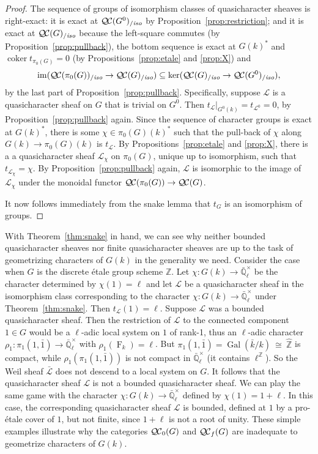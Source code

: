 \documentclass[11pt]{amsart}
\theoremstyle{plain}
\theoremstyle{definition}
\theoremstyle{remark}
\newcommand{\ZZ}{{\mathbb{Z}}}
\newcommand{\EE}{\mathbb{\bar Q}_\ell}
\newcommand{\bFq}{\bar{k}}
\newcommand{\Fq}{k}
\newcommand{\EEx}{\EE^\times}
\DeclareMathOperator{\Gal}{Gal}
\newcommand{\Frob}[1]{\operatorname{F}_{#1}}
\DeclareMathOperator{\coker}{coker}
\newcommand{\iso}{{\ \cong\ }}
\newcommand{\qcs}[1]{{\mathcal{#1}}}
\newcommand{\gqcs}[1]{{\mathcal{\bar #1}}}
\newcommand{\QC}{{\mathcal{Q\hskip-0.8pt C}}}
\newcommand{\QCb}{{\QC_0}}
\newcommand{\QCf}{{\QC_f}}
\newcommand{\QCiso}[1]{\QC(#1)_{/\textit{iso}}}
\newcommand{\image}{{\operatorname{im}}}
\newcommand{\trFrob}[1]{t_{#1}}
\begin{document}
\begin{proof}
  The sequence of groups of isomorphism classes of quasicharacter sheaves is right-exact: it is exact at
  $\QCiso{G^0}$ by Proposition~\ref{prop:restriction}; and
  it is exact at $\QCiso{G}$ because the left-square
  commutes (by Proposition~\ref{prop:pullback}), the bottom sequence
  is exact at $G(\Fq)^*$ and $\coker \trFrob{\pi_0(G)} =0$
  (by Propositions~\ref{prop:etale} and \ref{prop:X}) and
  \[
  \image(\QCiso{\pi_0(G)} \to \QCiso{G}) \subseteq \ker(\QCiso{G} \to \QCiso{G^0}),
  \]
  by the last part of Proposition~\ref{prop:pullback}. Specifically,
  suppose $\qcs{L}$ is a quasicharacter sheaf on $G$ that is trivial on
  $G^0$. Then $\trFrob{\qcs{L}}\vert_{G^0(\Fq)} = \trFrob{\qcs{L}^0} =0$,
  by Proposition~\ref{prop:pullback} again. Since the sequence of
  character groups is exact at $G(\Fq)^*$, there is
  some $\chi \in \pi_0(G)(\Fq)^*$ such that the
  pull-back of $\chi$ along $G(\Fq)\to \pi_0(G)(\Fq)$ is
  $\trFrob{\qcs{L}}$. By Propositions~\ref{prop:etale} and \ref{prop:X},
  there is a a quasicharacter sheaf $\qcs{L}_\chi$ on $\pi_0(G)$, unique up
  to isomorphism, such that $\trFrob{\qcs{L}_\chi} = \chi$. By
  Proposition~\ref{prop:pullback} again, $\qcs{L}$ is isomorphic to the
  image of $\qcs{L}_\chi$ under the monoidal functor $\QC(\pi_0(G)) \to \QC(G)$.

  It now follows immediately from the snake lemma that $\trFrob{G}$ is an
  isomorphism of groups.
\end{proof}

With Theorem~\ref{thm:snake} in hand, 
we can see why neither bounded quasicharacter sheaves 
nor finite quasicharacter sheaves are up to the task of 
geometrizing characters of $G(\Fq)$ in the generality we need.  
%
Consider the case when $G$ is the discrete \'etale group scheme $\ZZ$. 
Let $\chi : G(\Fq) \to \EEx$ be the character determined by $\chi(1) = \ell$ 
and let $\qcs{L}$ be a quasicharacter sheaf in the isomorphism class 
corresponding to the character $\chi : G(\Fq) \to \EEx$ under Theorem~\ref{thm:snake}. 
Then $\trFrob{\qcs{L}}(1) = \ell$. Suppose $\qcs{L}$ was a bounded quasicharacter sheaf. 
Then the restriction of $\qcs{L}$ to the connected component $1\in G$ 
would be a $\ell$-adic local system on $1$ of rank-1, 
thus an $\ell$-adic character $\rho_1 : \pi_1(1,{\bar 1}) \to \EEx$ with
$\rho_1(\Frob{\Fq}) = \ell$. But $\pi_1(1,{\bar 1}) = \Gal(\bFq/\Fq) \iso {\hat \ZZ}$ is compact, 
while $\rho_1(\pi_1(1,{\bar 1}))$ is not compact in $\EEx$ (it contains $\ell^\ZZ$). 
So the Weil sheaf $\gqcs{L}$ does not descend to a local system on $G$.
It follows that the quasicharacter sheaf $\qcs{L}$ is not a bounded quasicharacter sheaf.
%
We can play the same game with the character $\chi : G(\Fq) \to \EEx$ 
defined by $\chi(1) = 1+\ell$. In this case, the corresponding quasicharacter sheaf $\qcs{L}$ is bounded,
defined at $1$ by a pro-\'etale cover of $1$, but not finite, since $1+\ell$ is not a root of unity. 
%
These simple examples illustrate why the categories $\QCb(G)$ and $\QCf(G)$ are inadequate to geometrize characters of $G(\Fq)$.
\end{document}
